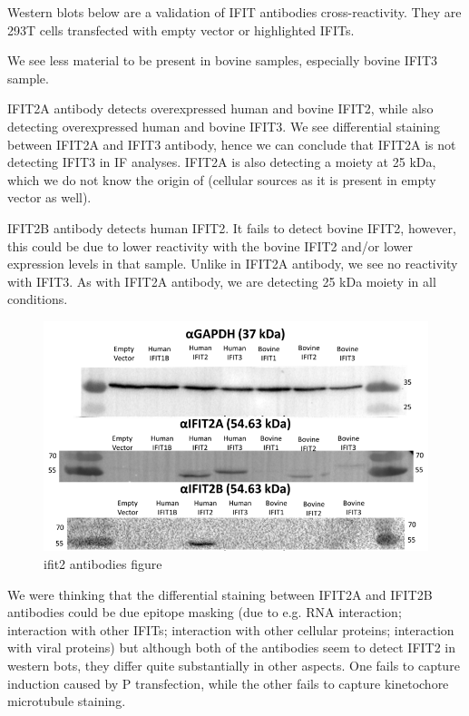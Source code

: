 Western blots below are a validation of IFIT antibodies cross-reactivity. They are 293T cells transfected with empty vector or highlighted IFITs.

We see less material to be present in bovine samples, especially bovine IFIT3 sample.

IFIT2A antibody detects overexpressed human and bovine IFIT2, while also detecting overexpressed human and bovine IFIT3. We see differential staining between IFIT2A and IFIT3 antibody, hence we can conclude that IFIT2A is not detecting IFIT3 in IF analyses. IFIT2A is also detecting a moiety at 25 kDa, which we do not know the origin of (cellular sources as it is present in empty vector as well).

IFIT2B antibody detects human IFIT2. It fails to detect bovine IFIT2, however, this could be due to lower reactivity with the bovine IFIT2 and/or lower expression levels in that sample. Unlike in IFIT2A antibody, we see no reactivity with IFIT3. As with IFIT2A antibody, we are detecting 25 kDa moiety in all conditions.

\begin{figure}
    \centering
    \includegraphics[width=1\linewidth]{10. Chapter 5//Figs//04. IFIT2AB Discussion/07. antibodies ifit2.png}
    \caption[ifit2 antibodies figure]{ifit2 antibodies figure}
    \label{fig:ifit2 antibodies figure}
\end{figure}

We were thinking that the differential staining between IFIT2A and IFIT2B antibodies could be due epitope masking (due to e.g. RNA interaction; interaction with other IFITs; interaction with other cellular proteins; interaction with viral proteins) but although both of the antibodies seem to detect IFIT2 in western bots, they differ quite substantially in other aspects. One fails to capture induction caused by P transfection, while the other fails to capture kinetochore microtubule staining.